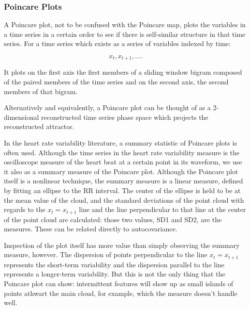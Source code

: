 \documentclass[12pt]{article}
\begin{document}
\subsubsection{Poincare Plots}

A Poincare plot\cite{hrv1}, not to be confused with the Poincare map, plots the variables in a time series in a certain order to see if there is self-similar structure in that time series. For a time series which exists as a series of variables indexed by time:

$$x_t, x_{t+1}, .... $$

It plots on the first axis the first members of a sliding window bigram composed of the paired members of the time series and on the second axis, the second members of that bigram.

Alternatively and equivalently, a Poincare plot can be thought of as a 2-dimensional reconstructed time series phase space which projects the reconstructed attractor\cite{kamen}.

In the heart rate variability literature, a summary statistic of Poincare plots is often used. Although the time series in the heart rate variability measure is the oscilloscope measure of the heart beat at a certain point in its waveform, we use it also as a summary measure of the Poincare plot. Although the Poincare plot itself is a nonlinear technique, the summary measure is a linear measure\cite{kamen}, defined by fitting an ellipse to the RR interval. The center of the ellipse is held to be at the mean value of the cloud, and the standard deviations of the point cloud with regards to the $x_t = x_{t+1}$ line and the line perpendicular to that line at the center of the point cloud are calculated: those two values, SD1 and SD2, are the measures. These can be related directly to autocovariance\cite{kamen}.

Inspection of the plot itself has more value than simply observing the summary measure, however. The dispersion of points perpendicular to the line $x_t = x_{t+1}$ represents the short-term variability and the dispersion parallel to the line represents a longer-term variability. But this is not the only thing that the Poincare plot can show: intermittent features will show up as small islands of points athwart the main cloud, for example, which the measure doesn't handle well.
\end{document}
